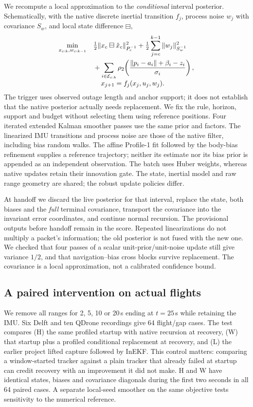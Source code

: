 \documentclass[conference,letterpaper,10pt]{IEEEtran}
\begin{document}
We recompute a local approximation to the \emph{conditional} interval posterior. Schematically, with the native discrete inertial transition $f_j$, process noise $w_j$ with covariance $S_w$, and local state difference $\boxminus$,
\begin{align}
 \min_{x_{c:k},w_{c:k-1}}\quad&
 \tfrac12\|x_c\boxminus\hat x_c\|^2_{P_c^{-1}}
 +\tfrac12\sum_{j=c}^{k-1}\|w_j\|^2_{S_w^{-1}}\nonumber\\
 &+\sum_{i\in\mathcal E_{c:k}}
 \rho_2\!\left(\frac{\|p_i-a_i\|+\beta_i-z_i}{\sigma_i}\right),
 \label{eq:replacement}\\[-3pt]
 &\hspace{4mm}x_{j+1}=f_j(x_j,u_j,w_j).\nonumber
\end{align}
The trigger uses observed outage length and anchor support; it does not establish that the native posterior actually needs replacement. We fix the rule, horizon, support and budget without selecting them using reference positions. Four iterated extended Kalman smoother passes use the same prior and factors. The linearized IMU transitions and process noise are those of the native filter, including bias random walks. The affine Profile-1 fit followed by the body-bias refinement supplies a reference trajectory; neither its estimate nor its bias prior is appended as an independent observation. The batch uses Huber weights, whereas native updates retain their innovation gate. The state, inertial model and raw range geometry are shared; the robust update policies differ.

At handoff we discard the live posterior for that interval, replace the state, both biases and the \emph{full} terminal covariance, transport the covariance into the invariant error coordinates, and continue normal recursion. The provisional outputs before handoff remain in the score. Repeated linearizations do not multiply a packet's information; the old posterior is not fused with the new one. We checked that four passes of a scalar unit-prior/unit-noise update still give variance $1/2$, and that navigation--bias cross blocks survive replacement. The covariance is a local approximation, not a calibrated confidence bound.

\subsection{A paired intervention on actual flights}
We remove all ranges for 2, 5, 10 or 20\,s ending at $t=25$\,s while retaining the IMU. Six Delft and ten QDrone recordings give 64 flight/gap cases. The test compares (H) the same profiled startup with native recursion at recovery, (W) that startup plus a profiled conditional replacement at recovery, and (L) the earlier project lifted capture followed by InEKF. This control matters: comparing a window-started tracker against a plain tracker that already failed at startup can credit recovery with an improvement it did not make. H and W have identical states, biases and covariance diagonals during the first two seconds in all 64 paired cases. A separate local-seed smoother on the same objective tests sensitivity to the numerical reference.
\end{document}
